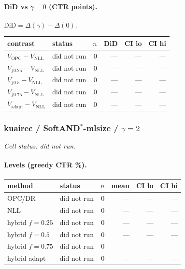 \documentclass[10pt,a4paper]{article}
\begin{document}
\paragraph{DiD vs $\gamma=0$ (CTR points).} $\mathrm{DiD}=\Delta(\gamma)-\Delta(0)$.
{\centering\small\begin{tabular}{llrrrr}
\toprule contrast & status & $n$ & DiD & CI lo & CI hi \\
\midrule
$V_{\mathrm{OPC}}-V_{\mathrm{NLL}}$ & did not run & 0 & --- & --- & --- \\
$V_{f0.25}-V_{\mathrm{NLL}}$ & did not run & 0 & --- & --- & --- \\
$V_{f0.5}-V_{\mathrm{NLL}}$ & did not run & 0 & --- & --- & --- \\
$V_{f0.75}-V_{\mathrm{NLL}}$ & did not run & 0 & --- & --- & --- \\
$V_{\mathrm{adapt}}-V_{\mathrm{NLL}}$ & did not run & 0 & --- & --- & --- \\
\bottomrule\end{tabular}\par}
\bigskip
\subsubsection{kuairec / SoftAND$^*$-mlsize / $\gamma=2$}
\emph{Cell status: did not run}.
\paragraph{Levels (greedy CTR \%).}
{\centering\small\begin{tabular}{llrrrr}
\toprule method & status & $n$ & mean & CI lo & CI hi \\
\midrule
OPC/DR & did not run & 0 & --- & --- & --- \\
NLL & did not run & 0 & --- & --- & --- \\
hybrid $f{=}0.25$ & did not run & 0 & --- & --- & --- \\
hybrid $f{=}0.5$ & did not run & 0 & --- & --- & --- \\
hybrid $f{=}0.75$ & did not run & 0 & --- & --- & --- \\
hybrid adapt & did not run & 0 & --- & --- & --- \\
\bottomrule\end{tabular}\par}
\end{document}
